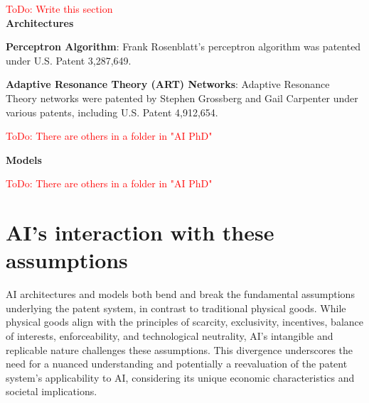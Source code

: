 \documentclass{article}[10pt]
\begin{document}
\textcolor{red}{ToDo: Write this section}\\
\textbf{Architectures}

\textbf{Perceptron Algorithm}: Frank Rosenblatt's perceptron algorithm was patented under U.S. Patent 3,287,649.

\textbf{Adaptive Resonance Theory (ART) Networks}: Adaptive Resonance Theory networks were patented by Stephen Grossberg and Gail Carpenter under various patents, including U.S. Patent 4,912,654.

\textcolor{red}{ToDo: There are others in a folder in "AI PhD"}

\textbf{Models}

\textcolor{red}{ToDo: There are others in a folder in "AI PhD"}

\section{AI's interaction with these assumptions}

AI architectures and models both bend and break the fundamental assumptions underlying the patent system, in contrast to traditional physical goods. While physical goods align with the principles of scarcity, exclusivity, incentives, balance of interests, enforceability, and technological neutrality, AI's intangible and replicable nature challenges these assumptions. This divergence underscores the need for a nuanced understanding and potentially a reevaluation of the patent system's applicability to AI, considering its unique economic characteristics and societal implications.
\end{document}
